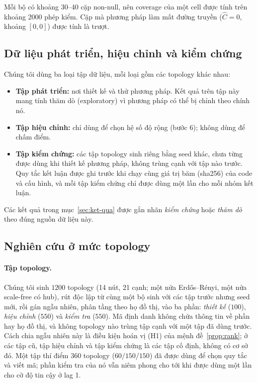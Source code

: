 Mỗi bộ có khoảng 30--40 cặp non-null, nên coverage của một cell được tính trên khoảng 2000 phép kiểm. Cặp mà phương pháp làm mất đường truyền ($\hat C=0$, khoảng $[0,0]$) được tính là trượt.

\subsection{Dữ liệu phát triển, hiệu chỉnh và kiểm chứng}
Chúng tôi dùng ba loại tập dữ liệu, mỗi loại gồm các topology khác nhau:
\begin{itemize}
  \item \textbf{Tập phát triển:} nơi thiết kế và thử phương pháp. Kết quả trên tập này mang tính thăm dò (exploratory) vì phương pháp có thể bị chỉnh theo chính nó.
  \item \textbf{Tập hiệu chỉnh:} chỉ dùng để chọn hệ số độ rộng (bước 6); không dùng để chấm điểm.
  \item \textbf{Tập kiểm chứng:} các tập topology sinh riêng bằng seed khác, chưa từng được dùng khi thiết kế phương pháp, không trùng cạnh với tập nào trước. Quy tắc kết luận được ghi trước khi chạy cùng giá trị băm (sha256) của code và cấu hình, và mỗi tập kiểm chứng chỉ được dùng một lần cho mỗi nhóm kết luận.
\end{itemize}
Các kết quả trong mục~\ref{sec:ket-qua} được gắn nhãn \emph{kiểm chứng} hoặc \emph{thăm dò} theo đúng nguồn dữ liệu này.

\subsection{Nghiên cứu ở mức topology}\label{sec:topology-study}
\paragraph{Tập topology.} Chúng tôi sinh $1200$ topology (14 nút, 21 cạnh; một nửa Erdős--Rényi, một nửa scale-free có hub), rút độc lập từ cùng một bộ sinh với các tập trước nhưng seed mới, rồi gán ngẫu nhiên, phân tầng theo họ đồ thị, vào ba phần: \emph{thiết kế} ($100$), \emph{hiệu chỉnh} ($550$) và \emph{kiểm tra} ($550$). Mã định danh không chứa thông tin về phần hay họ đồ thị, và không topology nào trùng tập cạnh với một tập đã dùng trước. Cách chia ngẫu nhiên này là điều kiện hoán vị (H1) của mệnh đề~\ref{prop:rank}; ở các tập cũ, tập hiệu chỉnh và tập kiểm chứng là các tập cố định, không có cơ sở đó. Một tập thí điểm $360$ topology ($60/150/150$) đã được dùng để chọn quy tắc và viết mã; phần kiểm tra của nó vẫn niêm phong cho tới khi được dùng một lần cho cờ độ tin cậy ở lag 1.

